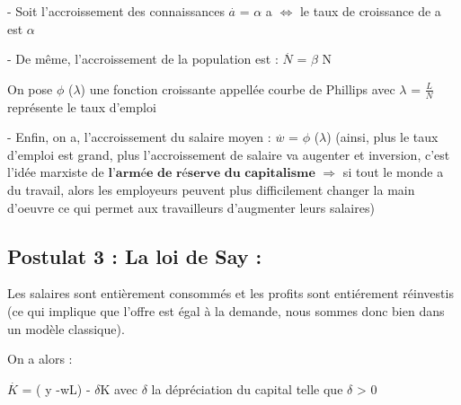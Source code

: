 \documentclass{article}
\begin{document}
- Soit l'accroissement des connaissances $\stackrel{.}{a}$ = $\alpha$ a  $\Leftrightarrow$ le taux de croissance de a est $\alpha$

- De même, l'accroissement de la population est : $\stackrel{.}{N}$ = $\beta$ N

On pose $\phi$  ($\lambda$) une fonction croissante appellée courbe de Phillips avec $\lambda$ = $\frac{L}{N}$ représente le taux d'emploi

- Enfin, on a, l'accroissement du salaire moyen : $\stackrel{.}{w}$ =  $\phi$ ($\lambda$) (ainsi, plus le taux d'emploi est grand, plus l'accroissement de salaire va augenter et inversion, c'est l'idée marxiste de $\textbf{l'armée de réserve du capitalisme}$ $\Rightarrow$ si tout le monde a du travail, alors les employeurs peuvent plus difficilement changer la main d'oeuvre ce qui permet aux travailleurs d'augmenter leurs salaires)

\subsection{ Postulat 3 : La loi de Say : }

Les salaires sont entièrement consommés et les profits sont entiérement réinvestis (ce qui implique que l'offre est égal à la demande, nous sommes donc bien dans un modèle classique). 

On a alors : 

$\stackrel{.}{K}$ = ( y -wL) - $\delta$K avec $\delta$ la dépréciation du capital telle que $\delta$ > 0
\end{document}
